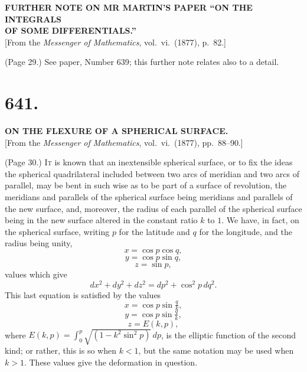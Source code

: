 \documentclass[11pt,a4paper]{article}
\begin{document}
\begin{center}
\textbf{FURTHER NOTE ON MR MARTIN'S PAPER ``ON THE INTEGRALS\\OF SOME DIFFERENTIALS.''}\\[1em]
[From the \textit{Messenger of Mathematics}, vol.~vi.\ (1877), p.\ 82.]
\end{center}

\medskip

\noindent (Page 29.) See paper, Number 639; this further note relates also to a detail.

\bigskip


\section*{641.}

\begin{center}
\textbf{ON THE FLEXURE OF A SPHERICAL SURFACE.}\\[1em]
[From the \textit{Messenger of Mathematics}, vol.~vi.\ (1877), pp.\ 88--90.]
\end{center}

\medskip

\noindent (Page 30.) \textsc{It} is known that an inextensible spherical surface, or to fix the ideas the spherical quadrilateral included between two arcs of meridian and two arcs of parallel, may be bent in such wise as to be part of a surface of revolution, the meridians and parallels of the spherical surface being meridians and parallels of the new surface, and, moreover, the radius of each parallel of the spherical surface being in the new surface altered in the constant ratio $k$ to $1$. We have, in fact, on the spherical surface, writing $p$ for the latitude and $q$ for the longitude, and the radius being unity,
\[
x = \cos p \cos q,
\]
\[
y = \cos p \sin q,
\]
\[
z = \sin p,
\]
values which give
\[
dx^2 + dy^2 + dz^2 = dp^2 + \cos^2 p \, dq^2.
\]
This last equation is satisfied by the values
\[
x = \cos p \sin \tfrac{q}{k},
\]
\[
y = \cos p \sin \tfrac{q}{k},
\]
\[
z = E(k, p),
\]
where $E(k, p) = \int_0^p \sqrt{(1 - k^2 \sin^2 p)} \, dp$, is the elliptic function of the second kind; or rather, this is so when $k < 1$, but the same notation may be used when $k > 1$. These values give the deformation in question.
\end{document}
